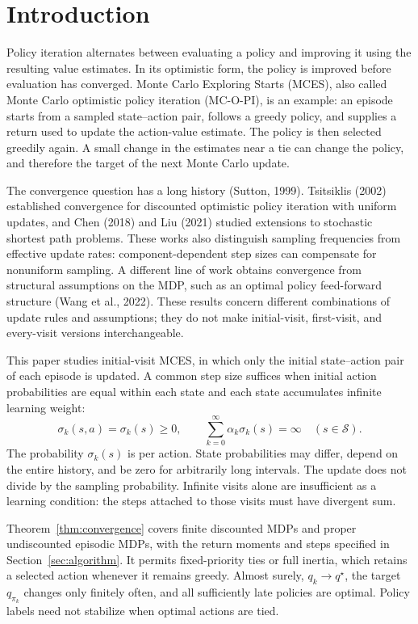 \section{Introduction}
Policy iteration alternates between evaluating a policy and improving it using the resulting
value estimates. In its optimistic form, the policy is improved before evaluation has converged.
Monte Carlo Exploring Starts (MCES), also called Monte Carlo optimistic policy iteration
(MC-O-PI), is an example: an episode starts from a sampled state--action pair, follows a
greedy policy, and supplies a return used to update the action-value estimate. The policy
is then selected greedily again. A small change in the estimates near a tie can change the
policy, and therefore the target of the next Monte Carlo update.

The convergence question has a long history (Sutton, 1999). Tsitsiklis (2002) established
convergence for discounted optimistic policy iteration with uniform updates, and Chen (2018)
and Liu (2021) studied extensions to stochastic shortest path problems. These works also
distinguish sampling frequencies from effective update rates: component-dependent step sizes
can compensate for nonuniform sampling. A different line of work obtains convergence from
structural assumptions on the MDP, such as an optimal policy feed-forward structure (Wang
et al., 2022). These results concern different combinations of update rules and assumptions;
they do not make initial-visit, first-visit, and every-visit versions interchangeable.

This paper studies initial-visit MCES, in which only the initial state--action pair of each
episode is updated. A common step size suffices when initial action probabilities are equal
within each state and each state accumulates infinite learning weight:
\[
\sigma_k(s,a)=\sigma_k(s)\ge0,\qquad
\sum_{k=0}^{\infty}\alpha_k\sigma_k(s)=\infty\quad(s\in\mathcal S).
\]
The probability $\sigma_k(s)$ is per action. State probabilities may differ, depend on the entire
history, and be zero for arbitrarily long intervals. The update does not divide by the sampling
probability. Infinite visits alone are insufficient as a learning condition: the steps attached to
those visits must have divergent sum.

Theorem~\ref{thm:convergence} covers finite discounted MDPs and proper undiscounted episodic MDPs, with
the return moments and steps specified in Section~\ref{sec:algorithm}. It permits fixed-priority ties or full
inertia, which retains a selected action whenever it remains greedy. Almost surely, $q_k\to q^\star$,
the target $q_{\pi_k}$ changes only finitely often, and all sufficiently late policies are optimal. Policy
labels need not stabilize when optimal actions are tied.


